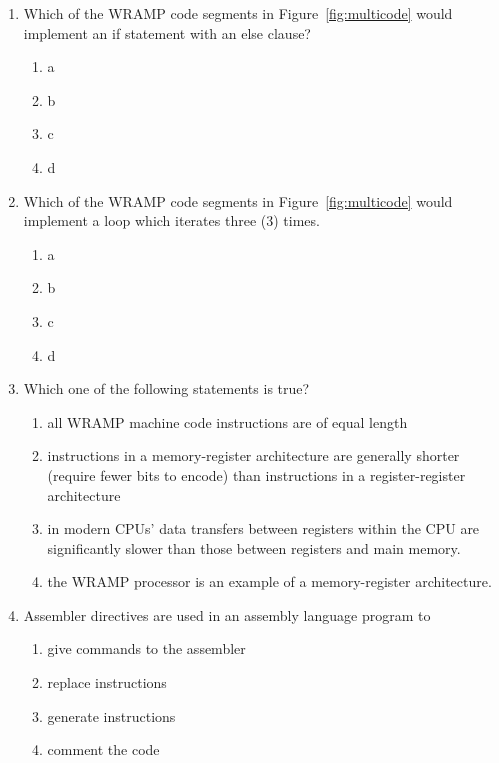 \documentclass[a4paper,10pt]{article}
\begin{document}
\begin{enumerate}
\item Which of the WRAMP code segments in Figure~\ref{fig:multicode}
would implement an if statement with an else clause?
\begin{enumerate}
  \item a
  \item b
  \item c
  \item d
\end{enumerate}

\item 
\label{ques:multicodeend}
Which of the WRAMP code segments in Figure~\ref{fig:multicode} would
implement a loop which iterates three (3) times.  
\begin{enumerate}
  \item a
  \item b
  \item c
  \item d
\end{enumerate}



\item Which one of the following statements is true?
\begin{enumerate}
  \item all WRAMP machine code instructions are of equal length
  \item instructions in a memory-register architecture are generally
   shorter (require fewer bits to encode) than instructions in a
   register-register architecture 
  \item in modern CPUs' data transfers between registers within the
  CPU are significantly slower than those between registers and main
  memory. 
  \item the WRAMP processor is an example of a memory-register architecture.
\end{enumerate}

\item Assembler directives are used in an assembly language program to
\begin{enumerate}
  \item give commands to the assembler
  \item replace instructions
  \item generate instructions
  \item comment the code
\end{enumerate}

\end{enumerate}
\end{document}
